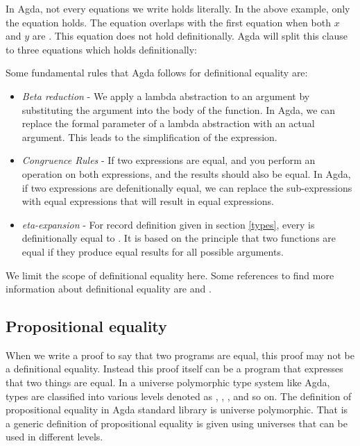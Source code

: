In Agda, not every equations we write holds literally. In the above example,
only the equation  holds. The equation  overlaps with the first equation when both $x$ and $y$ are
. This equation does not hold definitionally. Agda will split this
clause to three equations which holds definitionally:
\begin{description}
  \item[] 
  \item[] 
  \item[] 
\end{description}

Some fundamental rules that Agda follows for definitional equality are:
\begin{itemize}
  \item \emph{Beta reduction} - We apply a lambda abstraction to an argument by
  substituting the argument into the body of the function. In Agda, we can
  replace the formal parameter of a lambda abstraction with an actual argument.
  This leads to the simplification of the expression.
  \item \emph{Congruence Rules} - If two expressions are equal, and you perform
  an operation on both expressions, and the results should also be equal. In
  Agda, if two expressions are defenitionally equal, we can replace the
  sub-expressions with equal expressions that will result in equal expressions.
  \item \emph{eta-expansion} - For record definition  given in
  section \ref{types}, every  is definitionally equal to
  . It is based on
  the principle that two functions are equal if they produce equal results for
  all possible arguments. 
\end{itemize}

We limit the scope of definitional equality here. Some references to find more
information about definitional equality are \cite{norell2007towards} and
\cite{martin1984intuitionistic}. 

\subsection{Propositional equality}
When we write a proof to say that two programs are equal, this proof may not be
a definitional equality. Instead this proof itself can be a program that
expresses that two things are equal. In a universe polymorphic type system like
Agda, types are classified into various levels denoted as , ,
, and so on. The definition of propositional equality in Agda standard
library is universe polymorphic. That is a generic definition of propositional
equality is given using universes that can be used in different levels.

